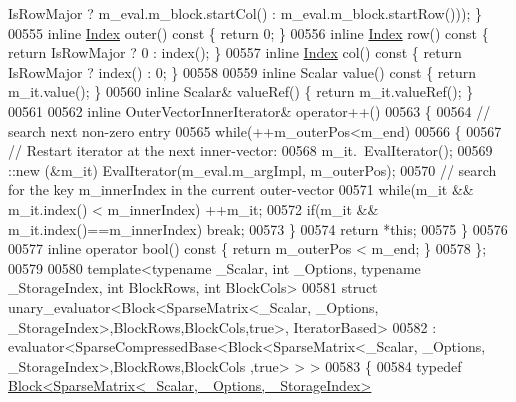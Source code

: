 \begin{DoxyCode}
      IsRowMajor ? m\_eval.m\_block.startCol() : m\_eval.m\_block.startRow())); \}
00555   \textcolor{keyword}{inline} \hyperlink{group___core___module_a554f30542cc2316add4b1ea0a492ff02}{Index} outer()\textcolor{keyword}{  const }\{ \textcolor{keywordflow}{return} 0; \}
00556   \textcolor{keyword}{inline} \hyperlink{group___core___module_a554f30542cc2316add4b1ea0a492ff02}{Index} row()\textcolor{keyword}{    const }\{ \textcolor{keywordflow}{return} IsRowMajor ? 0 : index(); \}
00557   \textcolor{keyword}{inline} \hyperlink{group___core___module_a554f30542cc2316add4b1ea0a492ff02}{Index} col()\textcolor{keyword}{    const }\{ \textcolor{keywordflow}{return} IsRowMajor ? index() : 0; \}
00558 
00559   \textcolor{keyword}{inline} Scalar value()\textcolor{keyword}{ const }\{ \textcolor{keywordflow}{return} m\_it.value(); \}
00560   \textcolor{keyword}{inline} Scalar& valueRef() \{ \textcolor{keywordflow}{return} m\_it.valueRef(); \}
00561 
00562   \textcolor{keyword}{inline} OuterVectorInnerIterator& operator++()
00563   \{
00564     \textcolor{comment}{// search next non-zero entry}
00565     \textcolor{keywordflow}{while}(++m\_outerPos<m\_end)
00566     \{
00567       \textcolor{comment}{// Restart iterator at the next inner-vector:}
00568       m\_it.~EvalIterator();
00569       ::new (&m\_it) EvalIterator(m\_eval.m\_argImpl, m\_outerPos);
00570       \textcolor{comment}{// search for the key m\_innerIndex in the current outer-vector}
00571       \textcolor{keywordflow}{while}(m\_it && m\_it.index() < m\_innerIndex) ++m\_it;
00572       \textcolor{keywordflow}{if}(m\_it && m\_it.index()==m\_innerIndex) \textcolor{keywordflow}{break};
00573     \}
00574     \textcolor{keywordflow}{return} *\textcolor{keyword}{this};
00575   \}
00576 
00577   \textcolor{keyword}{inline} \textcolor{keyword}{operator} bool()\textcolor{keyword}{ const }\{ \textcolor{keywordflow}{return} m\_outerPos < m\_end; \}
00578 \};
00579 
00580 \textcolor{keyword}{template}<\textcolor{keyword}{typename} \_Scalar, \textcolor{keywordtype}{int} \_Options, \textcolor{keyword}{typename} \_StorageIndex, \textcolor{keywordtype}{int} BlockRows, \textcolor{keywordtype}{int} BlockCols>
00581 \textcolor{keyword}{struct }unary\_evaluator<Block<SparseMatrix<\_Scalar, \_Options, \_StorageIndex>,BlockRows,BlockCols,true>, 
      IteratorBased>
00582   : evaluator<SparseCompressedBase<Block<SparseMatrix<\_Scalar, \_Options, \_StorageIndex>,BlockRows,BlockCols
      ,true> > >
00583 \{
00584   \textcolor{keyword}{typedef} \hyperlink{group___core___module_class_eigen_1_1_block}{Block<SparseMatrix<\_Scalar, \_Options, \_StorageIndex>}

\end{DoxyCode}
